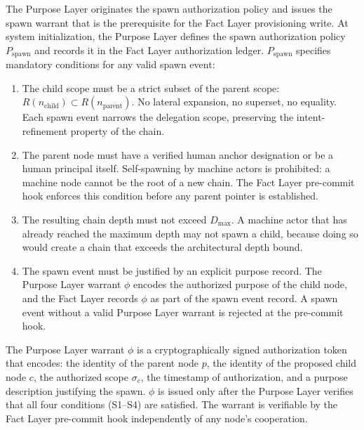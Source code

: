 The Purpose Layer originates the spawn authorization policy and issues the spawn warrant that is the prerequisite for the Fact Layer provisioning write. At system initialization, the Purpose Layer defines the spawn authorization policy $P_{\mathrm{spawn}}$ and records it in the Fact Layer authorization ledger. $P_{\mathrm{spawn}}$ specifies mandatory conditions for any valid spawn event:

\begin{enumerate}
    \item[(S1) \textbf{Scope refinement}] The child scope must be a strict subset of the parent scope: $R(n_{\mathrm{child}}) \subset R(n_{\mathrm{parent}})$. No lateral expansion, no superset, no equality. Each spawn event narrows the delegation scope, preserving the intent-refinement property of the chain.

    \item[(S2) \textbf{Human anchor verification}] The parent node must have a verified human anchor designation or be a human principal itself. Self-spawning by machine actors is prohibited: a machine node cannot be the root of a new chain. The Fact Layer pre-commit hook enforces this condition before any parent pointer is established.

    \item[(S3) \textbf{Depth bound compliance}] The resulting chain depth must not exceed $D_{\max}$. A machine actor that has already reached the maximum depth may not spawn a child, because doing so would create a chain that exceeds the architectural depth bound.

    \item[(S4) \textbf{Purpose alignment}] The spawn event must be justified by an explicit purpose record. The Purpose Layer warrant $\phi$ encodes the authorized purpose of the child node, and the Fact Layer records $\phi$ as part of the spawn event record. A spawn event without a valid Purpose Layer warrant is rejected at the pre-commit hook.
\end{enumerate}

The Purpose Layer warrant $\phi$ is a cryptographically signed authorization token that encodes: the identity of the parent node $p$, the identity of the proposed child node $c$, the authorized scope $\sigma_c$, the timestamp of authorization, and a purpose description justifying the spawn. $\phi$ is issued only after the Purpose Layer verifies that all four conditions (S1--S4) are satisfied. The warrant is verifiable by the Fact Layer pre-commit hook independently of any node's cooperation.

